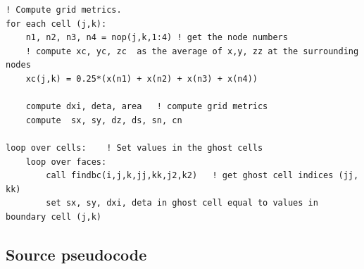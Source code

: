 \documentclass{article}
\begin{document}
\begin{lstlisting}
! Compute grid metrics.
for each cell (j,k):
	n1, n2, n3, n4 = nop(j,k,1:4) ! get the node numbers
	! compute xc, yc, zc  as the average of x,y, zz at the surrounding nodes
	xc(j,k) = 0.25*(x(n1) + x(n2) + x(n3) + x(n4))  

	compute dxi, deta, area   ! compute grid metrics
	compute  sx, sy, dz, ds, sn, cn			
	
loop over cells:	! Set values in the ghost cells
	loop over faces:	
		call findbc(i,j,k,jj,kk,j2,k2)   ! get ghost cell indices (jj, kk)
		set sx, sy, dxi, deta in ghost cell equal to values in boundary cell (j,k)
\end{lstlisting}

\subsection{Source pseudocode }
\end{document}
